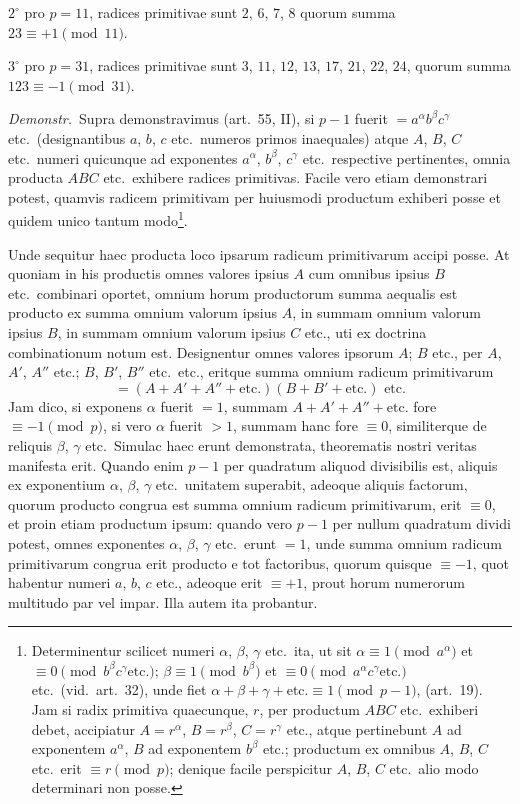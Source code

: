 \documentclass[12pt,a4paper]{article}
\theoremstyle{plain}
\theoremstyle{definition}
\theoremstyle{remark}
\begin{document}
$2^\circ$ pro $p = 11$, radices primitivae sunt $2$, $6$, $7$, $8$ quorum summa $23 \equiv +1 \pmod{11}$.

$3^\circ$ pro $p = 31$, radices primitivae sunt $3$, $11$, $12$, $13$, $17$, $21$, $22$, $24$, quorum summa $123 \equiv -1 \pmod{31}$.

\textit{Demonstr.}\ Supra demonstravimus (art.~55, II), si $p-1$ fuerit $= a^\alpha b^\beta c^\gamma$ etc.\ (designantibus $a$, $b$, $c$ etc.\ numeros primos inaequales) atque $A$, $B$, $C$ etc.\ numeri quicunque ad exponentes $a^\alpha$, $b^\beta$, $c^\gamma$ etc.\ respective pertinentes, omnia producta $ABC$ etc.\ exhibere radices primitivas. Facile vero etiam demonstrari potest, quamvis radicem primitivam per huiusmodi productum exhiberi posse et quidem unico tantum modo\footnote{Determinentur scilicet numeri $\alpha$, $\beta$, $\gamma$ etc.\ ita, ut sit $\alpha \equiv 1 \pmod{a^\alpha}$ et $\equiv 0 \pmod{b^\beta c^\gamma \text{etc.}}$; $\beta \equiv 1 \pmod{b^\beta}$ et $\equiv 0 \pmod{a^\alpha c^\gamma \text{etc.}}$ etc.\ (vid.\ art.~32), unde fiet $\alpha + \beta + \gamma + \text{etc.} \equiv 1 \pmod{p-1}$, (art.~19). Jam si radix primitiva quaecunque, $r$, per productum $ABC$ etc.\ exhiberi debet, accipiatur $A = r^\alpha$, $B = r^\beta$, $C = r^\gamma$ etc., atque pertinebunt $A$ ad exponentem $a^\alpha$, $B$ ad exponentem $b^\beta$ etc.; productum ex omnibus $A$, $B$, $C$ etc.\ erit $\equiv r \pmod{p}$; denique facile perspicitur $A$, $B$, $C$ etc.\ alio modo determinari non posse.}.

Unde sequitur haec producta loco ipsarum radicum primitivarum accipi posse. At quoniam in his productis omnes valores ipsius $A$ cum omnibus ipsius $B$ etc.\ combinari oportet, omnium horum productorum summa aequalis est producto ex summa omnium valorum ipsius $A$, in summam omnium valorum ipsius $B$, in summam omnium valorum ipsius $C$ etc., uti ex doctrina combinationum notum est. Designentur omnes valores ipsorum $A$; $B$ etc., per $A$, $A'$, $A''$ etc.; $B$, $B'$, $B''$ etc.\ etc., eritque summa omnium radicum primitivarum
\[
= (A + A' + A'' + \text{etc.})(B + B' + \text{etc.}) \text{ etc.}
\]
Jam dico, si exponens $\alpha$ fuerit $= 1$, summam $A + A' + A'' + \text{etc.}$ fore $\equiv -1 \pmod{p}$, si vero $\alpha$ fuerit $> 1$, summam hanc fore $\equiv 0$, similiterque de reliquis $\beta$, $\gamma$ etc.\ Simulac haec erunt demonstrata, theorematis nostri veritas manifesta erit. Quando enim $p-1$ per quadratum aliquod divisibilis est, aliquis ex exponentium $\alpha$, $\beta$, $\gamma$ etc.\ unitatem superabit, adeoque aliquis factorum, quorum producto congrua est summa omnium radicum primitivarum, erit $\equiv 0$, et proin etiam productum ipsum: quando vero $p-1$ per nullum quadratum dividi potest, omnes exponentes $\alpha$, $\beta$, $\gamma$ etc.\ erunt $= 1$, unde summa omnium radicum primitivarum congrua erit producto e tot factoribus, quorum quisque $\equiv -1$, quot habentur numeri $a$, $b$, $c$ etc., adeoque erit $\equiv +1$, prout horum numerorum multitudo par vel impar. Illa autem ita probantur.
\end{document}
